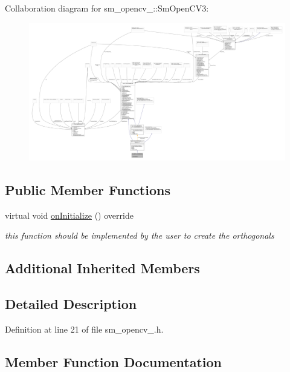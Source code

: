 Collaboration diagram for sm\+\_\+opencv\+\_\+:\+:Sm\+Open\+C\+V3\+:
\nopagebreak
\begin{figure}[H]
\begin{center}
\leavevmode
\includegraphics[width=350pt]{structsm__opencv__3_1_1SmOpenCV3__coll__graph}
\end{center}
\end{figure}
\subsection*{Public Member Functions}
\begin{DoxyCompactItemize}
\item 
virtual void \hyperlink{structsm__opencv__3_1_1SmOpenCV3_a596d368fb62df454ce0ec9d7f90604f5}{on\+Initialize} () override
\begin{DoxyCompactList}\small\item\em this function should be implemented by the user to create the orthogonals \end{DoxyCompactList}\end{DoxyCompactItemize}
\subsection*{Additional Inherited Members}


\subsection{Detailed Description}


Definition at line 21 of file sm\+\_\+opencv\+\_.\+h.



\subsection{Member Function Documentation}
\mbox{\label{structsm__opencv__3_1_1SmOpenCV3_a596d368fb62df454ce0ec9d7f90604f5}} 
